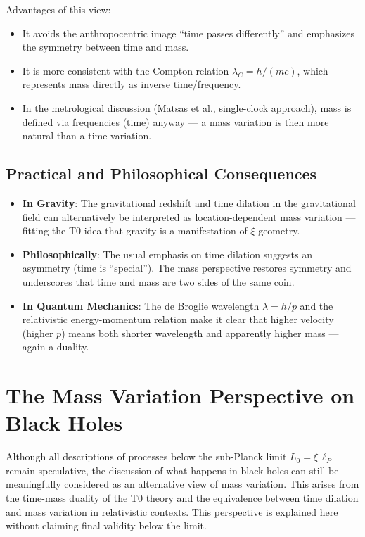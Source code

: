 	Advantages of this view:
	\begin{itemize}
		\item It avoids the anthropocentric image ``time passes differently'' and emphasizes the symmetry between time and mass.
		\item It is more consistent with the Compton relation $\lambda_C = h/(m c)$, which represents mass directly as inverse time/frequency.
		\item In the metrological discussion (Matsas et al., single-clock approach), mass is defined via frequencies (time) anyway --- a mass variation is then more natural than a time variation.
	\end{itemize}
	
	\subsection{Practical and Philosophical Consequences}
	\begin{itemize}
		\item \textbf{In Gravity}: The gravitational redshift and time dilation in the gravitational field can alternatively be interpreted as location-dependent mass variation --- fitting the T0 idea that gravity is a manifestation of $\xi$-geometry.
		\item \textbf{Philosophically}: The usual emphasis on time dilation suggests an asymmetry (time is ``special''). The mass perspective restores symmetry and underscores that time and mass are two sides of the same coin.
		\item \textbf{In Quantum Mechanics}: The de Broglie wavelength $\lambda = h/p$ and the relativistic energy-momentum relation make it clear that higher velocity (higher $p$) means both shorter wavelength and apparently higher mass --- again a duality.
	\end{itemize}
	
	\section{The Mass Variation Perspective on Black Holes}
	Although all descriptions of processes below the sub-Planck limit $L_0 = \xi \, \ell_P$ remain speculative, the discussion of what happens in black holes can still be meaningfully considered as an alternative view of mass variation. This arises from the time-mass duality of the T0 theory and the equivalence between time dilation and mass variation in relativistic contexts. This perspective is explained here without claiming final validity below the limit.
	
